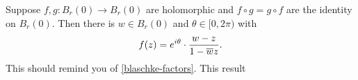 \documentclass{homework}
\begin{document}
                                                                                                                                                                                                                                                                                                                                                                      \begin{problem}\label{automorphisms-of-disk}Suppose $f, g : B_r(0) \to B_r(0)$ are holomorphic and
                                                                                                                                                                                                                                                                                                                                                                        $f \circ g = g \circ f$ are the identity on $B_r(0)$.  Then there is
                                                                                                                                                                                                                                                                                                                                                                          $w \in B_r(0)$ and $\theta \in [0,2\pi)$ with
                                                                                                                                                                                                                                                                                                                                                                            \[
                                                                                                                                                                                                                                                                                                                                                                                f(z) = e^{i\theta} \cdot \frac{w - z}{1 - \overline{w}z}.
                                                                                                                                                                                                                                                                                                                                                                                  \]
                                                                                                                                                                                                                                                                                                                                                                                    This should remind you of \ref{blaschke-factors}.  This result

\end{problem}
\end{document}
